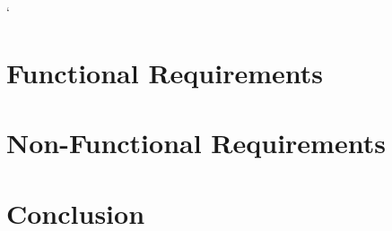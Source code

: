 `\documentclass[11pt,a4paper,titlepage]{article}
\begin{document}


\tableofcontents
\pagebreak

\section{Functional Requirements}









\newpage	
\section{Non-Functional Requirements}	




\newpage	
\section{Conclusion}


	
\end{document}
